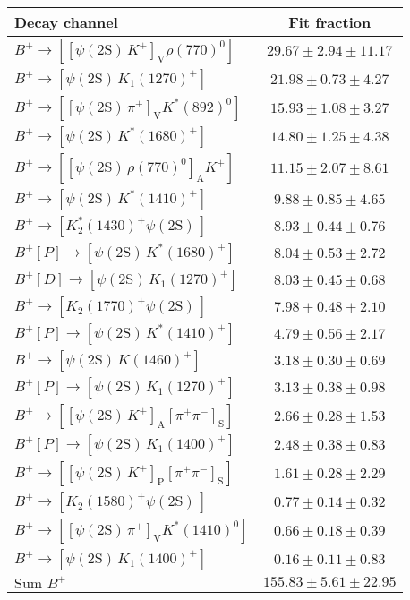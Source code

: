 \begin{tabular}{l c} 
\hline
\hline
Decay channel &  Fit fraction  \\ 
\hline
$B^{+}\rightarrow \left[\left[\psi(\text{2S})\,K^{+}\right]_{\text{V}}\rho(770)^{0}\right]$ & $29.67 \pm 2.94 \pm 11.17$ \\ 
$B^{+}\rightarrow \left[\psi(\text{2S})\,K_{1}(1270)^{+}\right]$ & $21.98 \pm 0.73 \pm 4.27$ \\ 
$B^{+}\rightarrow \left[\left[\psi(\text{2S})\,\pi^{+}\right]_{\text{V}}K^{*}(892)^{0}\right]$ & $15.93 \pm 1.08 \pm 3.27$ \\ 
$B^{+}\rightarrow \left[\psi(\text{2S})\,K^{*}(1680)^{+}\right]$ & $14.80 \pm 1.25 \pm 4.38$ \\ 
$B^{+}\rightarrow \left[\left[\psi(\text{2S})\,\rho(770)^{0}\right]_{\text{A}}K^{+}\right]$ & $11.15 \pm 2.07 \pm 8.61$ \\ 
$B^{+}\rightarrow \left[\psi(\text{2S})\,K^{*}(1410)^{+}\right]$ & $9.88 \pm 0.85 \pm 4.65$ \\ 
$B^{+}\rightarrow \left[K_{2}^{*}(1430)^{+}\psi(\text{2S})\,\right]$ & $8.93 \pm 0.44 \pm 0.76$ \\ 
$B^{+}\left[P\right]\rightarrow \left[\psi(\text{2S})\,K^{*}(1680)^{+}\right]$ & $8.04 \pm 0.53 \pm 2.72$ \\ 
$B^{+}\left[D\right]\rightarrow \left[\psi(\text{2S})\,K_{1}(1270)^{+}\right]$ & $8.03 \pm 0.45 \pm 0.68$ \\ 
$B^{+}\rightarrow \left[K_{2}(1770)^{+}\psi(\text{2S})\,\right]$ & $7.98 \pm 0.48 \pm 2.10$ \\ 
$B^{+}\left[P\right]\rightarrow \left[\psi(\text{2S})\,K^{*}(1410)^{+}\right]$ & $4.79 \pm 0.56 \pm 2.17$ \\ 
$B^{+}\rightarrow \left[\psi(\text{2S})\,K(1460)^{+}\right]$ & $3.18 \pm 0.30 \pm 0.69$ \\ 
$B^{+}\left[P\right]\rightarrow \left[\psi(\text{2S})\,K_{1}(1270)^{+}\right]$ & $3.13 \pm 0.38 \pm 0.98$ \\ 
$B^{+}\rightarrow \left[\left[\psi(\text{2S})\,K^{+}\right]_{\text{A}}\left[\pi^{+}\pi^{-}\right]_{\text{S}}\right]$ & $2.66 \pm 0.28 \pm 1.53$ \\ 
$B^{+}\left[P\right]\rightarrow \left[\psi(\text{2S})\,K_{1}(1400)^{+}\right]$ & $2.48 \pm 0.38 \pm 0.83$ \\ 
$B^{+}\rightarrow \left[\left[\psi(\text{2S})\,K^{+}\right]_{\text{P}}\left[\pi^{+}\pi^{-}\right]_{\text{S}}\right]$ & $1.61 \pm 0.28 \pm 2.29$ \\ 
$B^{+}\rightarrow \left[K_{2}(1580)^{+}\psi(\text{2S})\,\right]$ & $0.77 \pm 0.14 \pm 0.32$ \\ 
$B^{+}\rightarrow \left[\left[\psi(\text{2S})\,\pi^{+}\right]_{\text{V}}K^{*}(1410)^{0}\right]$ & $0.66 \pm 0.18 \pm 0.39$ \\ 
$B^{+}\rightarrow \left[\psi(\text{2S})\,K_{1}(1400)^{+}\right]$ & $0.16 \pm 0.11 \pm 0.83$ \\ 
$\text{Sum } B^{+}$ & $155.83 \pm 5.61 \pm 22.95$ \\ 
\hline
\hline
\end{tabular}

